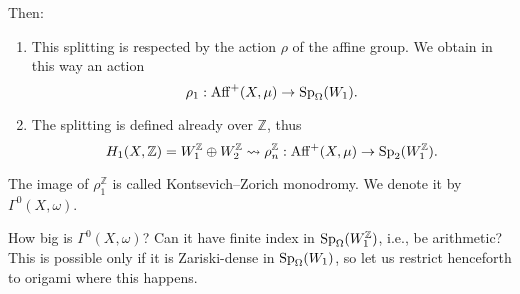 \documentclass[reqno]{amsart} 
\numberwithin{theorem}{section}
\numberwithin{equation}{section}
\begin{document}
Then:
\begin{enumerate}
\item This splitting is respected by the action $\rho$ of the affine group.  We obtain in this way an action
  \begin{equation*}
    \rho_1 : \operatorname{Aff}^+(X, \mu) \rightarrow \operatorname{Sp}_\Omega(W_1).
  \end{equation*}

\item The splitting is defined already over $\mathbb{Z}$, thus
  \begin{equation*}
    H_1(X, \mathbb{Z}) = W_1^{\mathbb{Z}} \oplus W_2^{\mathbb{Z}} \rightsquigarrow \rho_n^{\mathbb{Z}} : \operatorname{Aff}^+(X, \mu)
    \rightarrow \operatorname{Sp}_2(W_1^{\mathbb{Z}}).
  \end{equation*}
  
\end{enumerate}
\begin{definition}
  The image of $\rho_1^{\mathbb{Z}}$ is called Kontsevich--Zorich monodromy.  We denote it by $\Gamma^0(X, \omega)$.
\end{definition}
\begin{question}
  How big is $\Gamma^0(X, \omega)$?  Can it have finite index in $\operatorname{Sp}_\Omega(W_1^{\mathbb{Z}})$, i.e., be arithmetic?  This is possible only if it is Zariski-dense in $\operatorname{Sp}_\Omega(W_1)$, so let us restrict henceforth to origami where this happens.
\end{question}
\end{document}
